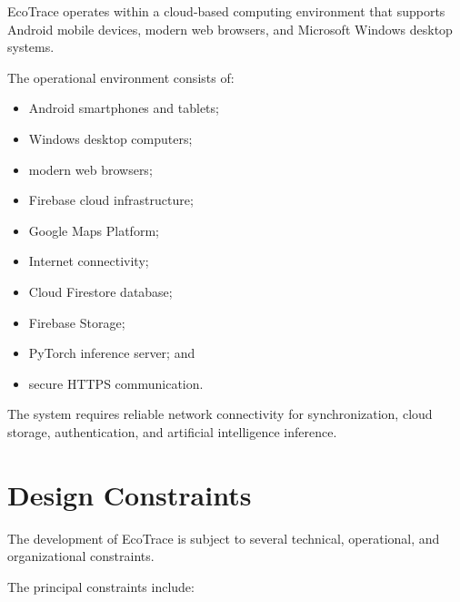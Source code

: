 EcoTrace operates within a cloud-based computing environment that
supports Android mobile devices, modern web browsers, and Microsoft
Windows desktop systems.

The operational environment consists of:

\begin{itemize}

\item Android smartphones and tablets;

\item Windows desktop computers;

\item modern web browsers;

\item Firebase cloud infrastructure;

\item Google Maps Platform;

\item Internet connectivity;

\item Cloud Firestore database;

\item Firebase Storage;

\item PyTorch inference server; and

\item secure HTTPS communication.

\end{itemize}

The system requires reliable network connectivity for synchronization,
cloud storage, authentication, and artificial intelligence inference.

\section{Design Constraints}
\label{sec:design-constraints}%

The development of EcoTrace is subject to several technical,
operational, and organizational constraints.

The principal constraints include:


